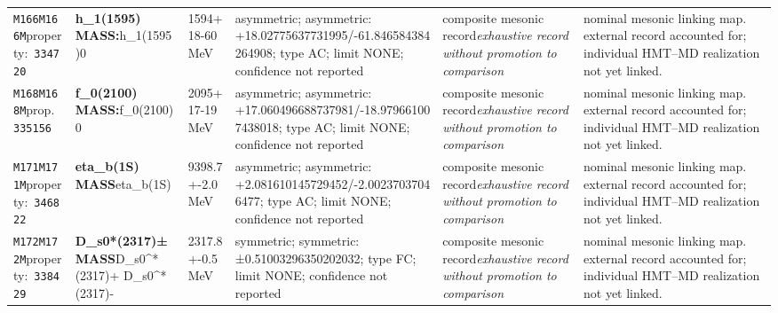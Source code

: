 \begin{landscape}
\begin{longtable}{L{1.85cm}L{4.45cm}L{2.35cm}L{4.05cm}L{3.35cm}L{7.15cm}}
\texttt{M166}\newline \texttt{M166M}\newline property:\ \texttt{334720} & \textbf{h\_\allowbreak{}1(1595) MASS:}\newline h\_\allowbreak{}1(1595)0 & 1594+18-60\,MeV & asymmetric; asymmetric: +18.02775637731995/-61.846584384264908; type AC; limit NONE; confidence not reported & composite mesonic record\newline \emph{exhaustive record without promotion to comparison} & nominal mesonic linking map. external record accounted for; individual HMT--MD realization not yet linked. \\
\texttt{M168}\newline \texttt{M168M}\newline prop.\ \texttt{335156} & \textbf{f\_\allowbreak{}0(2100) MASS:}\newline f\_\allowbreak{}0(2100)0 & 2095+17-19\,MeV & asymmetric; asymmetric: +17.060496688737981/-18.979661007438018; type AC; limit NONE; confidence not reported & composite mesonic record\newline \emph{exhaustive record without promotion to comparison} & nominal mesonic linking map. external record accounted for; individual HMT--MD realization not yet linked. \\
\texttt{M171}\newline \texttt{M171M}\newline property:\ \texttt{346822} & \textbf{eta\_\allowbreak{}b(1S) MASS}\newline eta\_\allowbreak{}b(1S) & 9398.7+-2.0\,MeV & asymmetric; asymmetric: +2.081610145729452/-2.00237037046477; type AC; limit NONE; confidence not reported & composite mesonic record\newline \emph{exhaustive record without promotion to comparison} & nominal mesonic linking map. external record accounted for; individual HMT--MD realization not yet linked. \\
\texttt{M172}\newline \texttt{M172M}\newline property:\ \texttt{338429} & \textbf{D\_\allowbreak{}s0*(2317)± MASS}\newline D\_\allowbreak{}s0\textasciicircum{}*(2317)+ \textbar{}\allowbreak{} D\_\allowbreak{}s0\textasciicircum{}*(2317)- & 2317.8+-0.5\,MeV & symmetric; symmetric: ±0.51003296350202032; type FC; limit NONE; confidence not reported & composite mesonic record\newline \emph{exhaustive record without promotion to comparison} & nominal mesonic linking map. external record accounted for; individual HMT--MD realization not yet linked. \\

\end{longtable}
\end{landscape}
